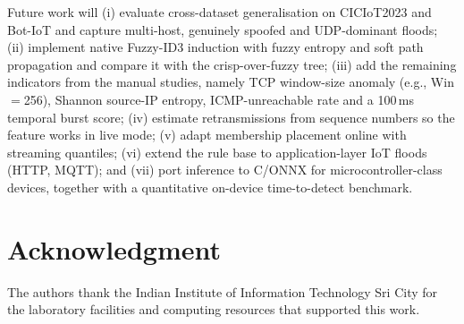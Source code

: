 \documentclass[conference]{IEEEtran}
\begin{document}
Future work will (i) evaluate cross-dataset generalisation on CICIoT2023 and Bot-IoT and capture multi-host, genuinely spoofed and UDP-dominant floods; (ii) implement native Fuzzy-ID3 induction with fuzzy entropy and soft path propagation and compare it with the crisp-over-fuzzy tree; (iii) add the remaining indicators from the manual studies, namely TCP window-size anomaly (e.g., Win$=$256), Shannon source-IP entropy, ICMP-unreachable rate and a 100\,ms temporal burst score; (iv) estimate retransmissions from sequence numbers so the feature works in live mode; (v) adapt membership placement online with streaming quantiles; (vi) extend the rule base to application-layer IoT floods (HTTP, MQTT); and (vii) port inference to C/ONNX for microcontroller-class devices, together with a quantitative on-device time-to-detect benchmark.

\section*{Acknowledgment}
The authors thank the Indian Institute of Information Technology Sri City for the laboratory facilities and computing resources that supported this work.
\end{document}
